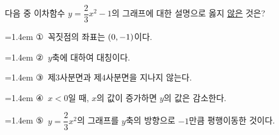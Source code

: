 다음 중 이차함수 $y=\dfrac{2}{3}x^2-1$의 그래프에 대한 설명으로 옳지 \underline{않은} 것은?
\par\medskip\par\noindent\hangindent=1.4em {\small ①}\ 꼭짓점의 좌표는 $(0{,}\mkern3mu\mathopen{}-1)$이다.\par\noindent\hangindent=1.4em {\small ②}\ $y$축에 대하여 대칭이다.\par\noindent\hangindent=1.4em {\small ③}\ 제$3$사분면과 제$4$사분면을 지나지 않는다.\par\noindent\hangindent=1.4em {\small ④}\ $x<0$일 때, $x$의 값이 증가하면 $y$의 값은 감소한다.\par\noindent\hangindent=1.4em {\small ⑤}\ $y=\dfrac{2}{3}x^2$의 그래프를 $y$축의 방향으로 $-1$만큼 평행이동한 것이다.\par\medskip
